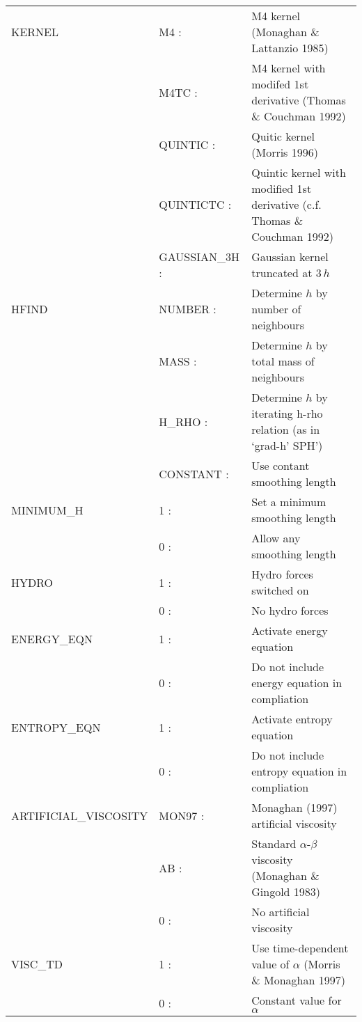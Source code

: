 \documentclass[a4paper]{article}
\begin{document}
\begin{center}
\begin{supertabular}{|p{4.6cm}|p{4.6cm} p{6.4cm}|}
 KERNEL        & M4      :& M4 kernel (Monaghan \& Lattanzio 1985) \\
               & M4TC    :& M4 kernel with modifed 1st derivative (Thomas \& Couchman 1992) \\ 
               & QUINTIC :& Quitic kernel (Morris 1996) \\
               & QUINTICTC :& Quintic kernel with modified 1st derivative (c.f. Thomas \& Couchman 1992) \\
               & GAUSSIAN\_3H :& Gaussian kernel truncated at $3\,h$ \\ \hline

 HFIND         & NUMBER   :& Determine $h$ by number of neighbours \\
               & MASS     :& Determine $h$ by total mass of neighbours \\ 
               & H\_RHO   :& Determine $h$ by iterating h-rho relation (as in `grad-h' SPH') \\
               & CONSTANT :& Use contant smoothing length \\ \hline

 MINIMUM\_H    & 1 :& Set a minimum smoothing length \\
               & 0 :& Allow any smoothing length \\ \hline

 HYDRO         & 1 :& Hydro forces switched on \\
               & 0 :& No hydro forces \\ \hline

 ENERGY\_EQN   & 1 :& Activate energy equation \\
               & 0 :& Do not include energy equation in compliation \\ \hline

 ENTROPY\_EQN  & 1 :& Activate entropy equation \\
               & 0 :& Do not include entropy equation in compliation \\ \hline

 ARTIFICIAL\_VISCOSITY  & MON97 :& Monaghan (1997) artificial viscosity \\
               & AB    :& Standard $\alpha$-$\beta$ viscosity (Monaghan \& Gingold 1983)\\
               & 0     :& No artificial viscosity \\ \hline

 VISC\_TD      & 1  :& Use time-dependent value of $\alpha$ (Morris \& Monaghan 1997)\\
               & 0  :& Constant value for $\alpha$ \\ \hline


\end{supertabular}
\end{center}
\end{document}
